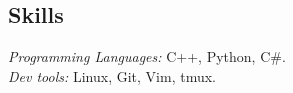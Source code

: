 \documentclass[margin, 10pt]{res} %
\begin{document}
\begin{resume}



\section{Skills} 

{\sl Programming Languages:} C++, Python, C\#. \\
{\sl Dev tools:} Linux, Git, Vim, tmux.






\end{resume}
\end{document}
